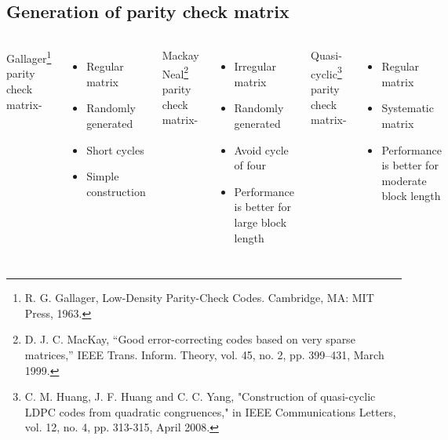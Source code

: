 \documentclass[xcolor=dvipsname]
{beamer}
\begin{document}
\subsection{ Generation of parity check matrix }
\begin{frame}[t]
\begin{columns}[t]
\alert{ Gallager\footnote[frame]{R. G. Gallager, Low-Density Parity-Check Codes. Cambridge, MA: MIT
Press, 1963.} parity check matrix-}
\vspace{3mm}
		\begin{itemize}
		[triangle]
		\item Regular matrix
		\item Randomly generated	
		\item Short cycles	
		\item Simple construction
		\end{itemize}

\pause			
{}
\alert{	 Mackay Neal\footnote[frame]{D. J. C. MacKay, “Good error-correcting codes based on very sparse matrices,” IEEE Trans. Inform. Theory, vol. 45, no. 2, pp. 399–431, March
1999.}  parity check matrix-}
		\begin{itemize}
		[triangle]
		\item Irregular matrix
		\item Randomly generated
		\item Avoid cycle of four
		\item Performance is better for large block length	
		\end{itemize}
			
\pause			
{}
\alert{ Quasi-cyclic\footnote[frame]{C. M. Huang, J. F. Huang and C. C. Yang, "Construction of quasi-cyclic
LDPC codes from quadratic congruences," in IEEE Communications
Letters, vol. 12, no. 4, pp. 313-315, April 2008.} parity check matrix-}
		\begin{itemize}
		[triangle]
		\item Regular matrix
		\item Systematic matrix
		\item Performance is better for moderate block length
		\end{itemize}						
\end{columns}
\end{frame}
		
		
\end{document}
